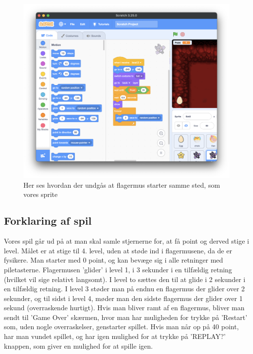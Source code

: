\documentclass[12pt,a4paper]{article}
\begin{document}
\begin{figure}[H]
    \centering
    \includegraphics[width=\linewidth]{flagermus.png}
    \caption{Her ses hvordan der undgås at flagermus starter samme sted, som vores sprite}
    \label{fig:4}
\end{figure}
\pagebreak

\subsection{Forklaring af spil}
Vores spil går ud på at man skal samle stjernerne for, at få point og derved stige i level. Målet er at stige til 4. level, uden at støde ind i flagermusene, da de er fysikere. Man starter med 0 point, og kan bevæge sig i alle retninger med piletasterne. Flagermusen 'glider' i level 1, i 3 sekunder i en tilfældig retning (hvilket vil sige relativt langsomt). I level to sættes den til at glide i 2 sekunder i en tilfældig retning. I level 3 støder man på endnu en flagermus der glider over 2 sekunder, og til sidst i level 4, møder man den sidste flagermus der glider over 1 sekund (overraskende hurtigt). Hvis man bliver ramt af en flagermus, bliver man sendt til 'Game Over' skærmen, hvor man har muligheden for trykke på 'Restart' som, uden nogle overraskelser, genstarter spillet. Hvis man når op på 40 point, har man vundet spillet, og har igen mulighed for at trykke på 'REPLAY?' knappen, som giver en mulighed for at spille igen. 
\end{document}
